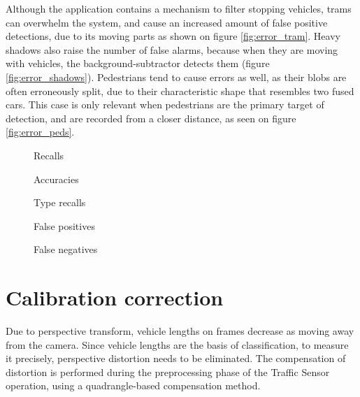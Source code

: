 Although the application contains a mechanism to filter stopping vehicles, trams can overwhelm the system, and cause an increased amount of false positive detections, due to its moving parts as shown on figure \ref{fig:error_tram}.
Heavy shadows also raise the number of false alarms, because when they are moving with vehicles, the background-subtractor detects them (figure \ref{fig:error_shadows}).
Pedestrians tend to cause errors as well, as their blobs are often erroneously split, due to their characteristic shape that resembles two fused cars.
This case is only relevant when pedestrians are the primary target of detection, and are recorded from a closer distance, as seen on figure \ref{fig:error_peds}.

\begin{figure}[p]
	\centering
	\caption{Recalls \label{chart:recalls}}
\end{figure}

\begin{figure}[p]
	\centering
	\caption{Accuracies \label{chart:accuracies}}
\end{figure}

\begin{figure}[p]
	\centering
	\caption{Type recalls \label{chart:type_recalls}}
\end{figure}

\begin{figure}[p]
	\centering
	\caption{False positives \label{chart:false_positives}}
\end{figure}

\begin{figure}[p]
	\centering
	\caption{False negatives \label{chart:false_negatives}}
\end{figure}

\FloatBarrier
\section{Calibration correction}\label{chap:cal_corr}
Due to perspective transform, vehicle lengths on frames decrease as moving away from the camera.
Since vehicle lengths are the basis of classification, to measure it precisely, perspective distortion needs to be eliminated.
The compensation of distortion is performed during the preprocessing phase of the Traffic Sensor operation, using a quadrangle-based compensation method.

